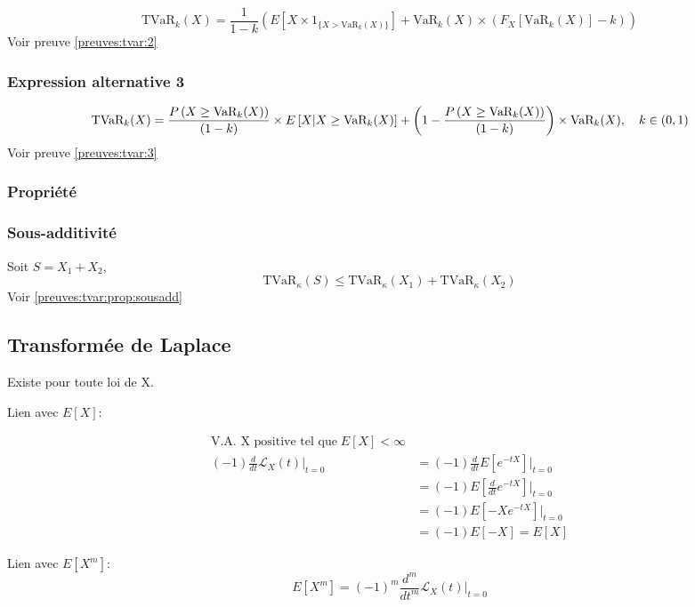 \[
\text{TVaR}_k(X)= \frac{1}{1-k}\left(E\left[X\times\mathrm{1}_{\{X>{\text{VaR}_k(X)}\}}\right]+\text{VaR}_k(X)\times\left(F_X\left[\text{VaR}_k(X)\right]-k\right)\right)
\] Voir preuve \ref{preuves:tvar:2}

\subsubsection*{Expression alternative 3}\label{intro:tvar:alt3}

\[
\text{TVaR}_k(X)= \frac{P\left(X\ge \text{VaR}_k(X)\right)}{(1-k)} \times E\left[X|X \ge \text{VaR}_k(X)\right]+\left(1-\frac{P\left(X\ge \text{VaR}_k(X)\right)}{(1-k)}\right)\times\text{VaR}_k(X),\\
\quad k\in (0,1)
\] Voir preuve \ref{preuves:tvar:3}

\subsubsection*{Propriété}\label{propriete-1}


\subsubsection*{Sous-additivité}\label{sous-additivite}

\label{intro:tvar:prop:sousadd} Soit \(S=X_1+X_2\), \[
\text{TVaR}_{\kappa}(S)\le \text{TVaR}_{\kappa}(X_1)+\text{TVaR}_{\kappa}(X_2)
\] Voir \autoref{preuves:tvar:prop:sousadd}

\subsection{Transformée de Laplace}\label{transformee-de-laplace}

Existe pour toute loi de X.

Lien avec \(E[X]\):

\begin{align*}
\text{V.A. X positive tel que}\; E[X]<\infty& \\ 
(-1)\frac{d}{dt}\mathcal{L}_X(t)\vert_{t=0}& =(-1)\frac{d}{dt}E\left[e^{-tX}\right]\vert_{t=0}\\
& =(-1)E\left[\frac{d}{dt}e^{-tX}\right]\vert_{t=0}\\
& =(-1)E\left[-Xe^{-tX}\right]\vert_{t=0}\\
& =(-1)E[-X] = E[X]
\end{align*}

Lien avec \(E[X^m]\): \[
E[X^m]=(-1)^m\frac{d^m}{dt^m}\mathcal{L}_X(t)\vert_{t=0}
\]

